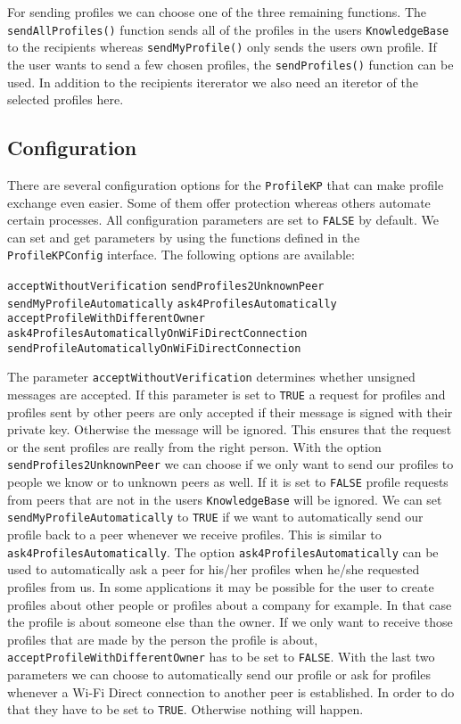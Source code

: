 For sending profiles we can choose one of the three remaining functions. The {\tt sendAllProfiles()} function sends all of the profiles in the users {\tt KnowledgeBase} to the recipients whereas {\tt sendMyProfile()} only sends the users own profile. If the user wants to send a few chosen profiles, the {\tt sendProfiles()} function can be used. In addition to the recipients itererator we also need an iteretor of the selected profiles here.



\subsection{Configuration}
There are several configuration options for the {\tt ProfileKP} that can make profile exchange even easier. Some of them offer protection whereas others automate certain processes. 
All configuration parameters are set to {\tt FALSE} by default. We can set and get parameters by using the functions defined in the {\tt ProfileKPConfig} interface. The following options are available:

	{\tt acceptWithoutVerification}
	{\tt sendProfiles2UnknownPeer}
	{\tt sendMyProfileAutomatically}
	{\tt ask4ProfilesAutomatically}
	{\tt acceptProfileWithDifferentOwner}
	{\tt ask4ProfilesAutomaticallyOnWiFiDirectConnection}
	{\tt sendProfileAutomaticallyOnWiFiDirectConnection}

The parameter {\tt acceptWithoutVerification} determines whether unsigned messages are accepted. If this parameter is set to {\tt TRUE} a request for profiles and profiles sent by other peers are only accepted if their message is signed with their private key. Otherwise the message will be ignored. This ensures that the request or the sent profiles are really from the right person.
With the option {\tt sendProfiles2UnknownPeer} we can choose if we only want to send our profiles to people we know or to unknown peers as well. If it is set to {\tt FALSE} profile requests from peers that are not in the users {\tt KnowledgeBase} will be ignored.
We can set {\tt sendMyProfileAutomatically} to {\tt TRUE} if we want to automatically send our profile back to a peer whenever we receive profiles. This is similar to  {\tt ask4ProfilesAutomatically}. The option {\tt ask4ProfilesAutomatically} can be used to automatically ask a peer for his/her profiles when he/she requested profiles from us.
In some applications it may be possible for the user to create profiles about other people or profiles about a company for example. In that case the profile is about someone else than the owner. If we only want to receive those profiles that are made by the person the profile is about, {\tt acceptProfileWithDifferentOwner} has to be set to {\tt FALSE}.
With the last two parameters we can choose to automatically send our profile or ask for profiles whenever a Wi-Fi Direct connection to another peer is established. In order to do that they have to be set to {\tt TRUE}. Otherwise nothing will happen.



